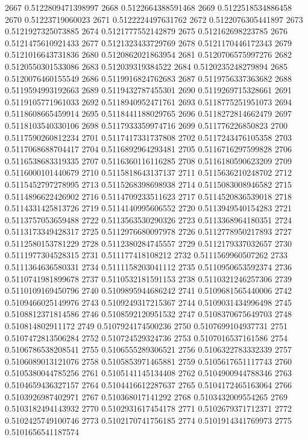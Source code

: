 2667 0.5122809471398997
2668 0.5122664388591468
2669 0.5122518534886458
2670 0.51223719060023
2671 0.5122224497631762
2672 0.5122076305441897
2673 0.5121927325073885
2674 0.5121777552142879
2675 0.512162698223785
2676 0.5121475610921433
2677 0.5121323433729769
2678 0.5121170446172343
2679 0.5121016643731836
2680 0.5120862021863954
2681 0.5120706575997276
2682 0.5120550301533086
2683 0.512039319384522
2684 0.5120235248279894
2685 0.5120076460155549
2686 0.5119916824762683
2687 0.5119756337363682
2688 0.5119594993192663
2689 0.5119432787455301
2690 0.5119269715328661
2691 0.5119105771961033
2692 0.5118940952471761
2693 0.5118775251951073
2694 0.5118608665459914
2695 0.5118441188029765
2696 0.5118272814662479
2697 0.5118103540330106
2698 0.5117933359974716
2699 0.511776226850823
2700 0.5117590260812234
2701 0.5117417331737808
2702 0.5117243476105358
2703 0.5117068688704417
2704 0.5116892964293481
2705 0.5116716297599828
2706 0.5116538683319335
2707 0.5116360116116285
2708 0.5116180590623209
2709 0.5116000101440679
2710 0.5115818643137137
2711 0.5115636210248702
2712 0.5115452797278995
2713 0.5115268398698938
2714 0.5115083008946582
2715 0.5114896622426902
2716 0.5114709233511623
2717 0.5114520836539018
2718 0.5114331425813726
2719 0.5114140995606552
2720 0.5113949540154283
2721 0.5113757053659488
2722 0.5113563530290326
2723 0.5113368964180351
2724 0.5113173349428317
2725 0.5112976680097978
2726 0.5112778950217893
2727 0.5112580153781229
2728 0.5112380284745557
2729 0.5112179337032657
2730 0.5111977304528315
2731 0.511177418108212
2732 0.5111569960507262
2733 0.5111364636580331
2734 0.5111158203041112
2735 0.5110950653592374
2736 0.5110741981899678
2737 0.5110532181591153
2738 0.5110321246257306
2739 0.5110109169450796
2740 0.5109895944686242
2741 0.5109681565440006
2742 0.5109466025149976
2743 0.5109249317215367
2744 0.5109031434996498
2745 0.5108812371814586
2746 0.5108592120951532
2747 0.5108370675649703
2748 0.510814802911172
2749 0.5107924174500236
2750 0.5107699104937731
2751 0.5107472813506284
2752 0.510724529324736
2753 0.5107016537161586
2754 0.5106786538208541
2755 0.5106555289306521
2756 0.5106322783332339
2757 0.5106089013121076
2758 0.5105853971465881
2759 0.5105617651117743
2760 0.5105380044785256
2761 0.5105141145134408
2762 0.5104900944788346
2763 0.5104659436327157
2764 0.5104416612287637
2765 0.5104172465163064
2766 0.5103926987402971
2767 0.510368017141292
2768 0.5103432009554265
2769 0.5103182494143932
2770 0.5102931617454178
2771 0.5102679371712371
2772 0.5102425749100746
2773 0.5102170741756185
2774 0.5101914341769973
2775 0.5101656541187574
